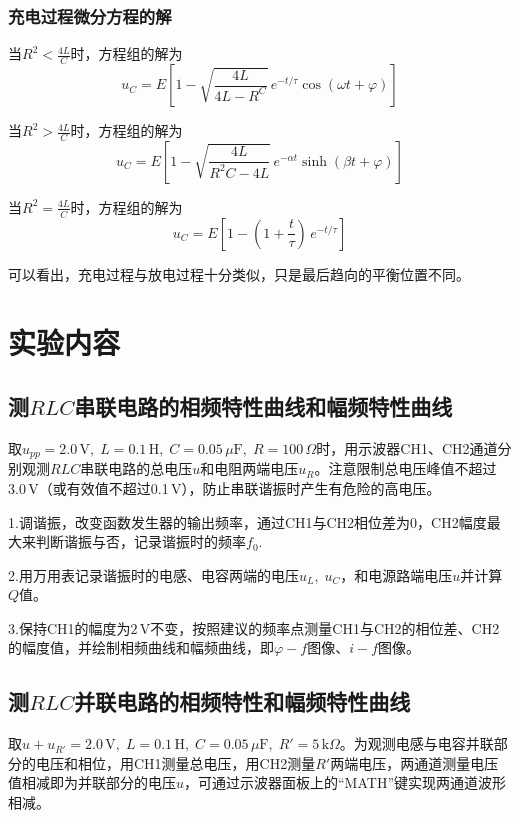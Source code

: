 \documentclass[UTF8]{article}
\theoremstyle{MyLineTheoremStyle} %
\theoremstyle{MyBlockTheoremStyle} %
\theoremstyle{MySubsubsectionStyle} %
\begin{document}
\subsubsection{充电过程微分方程的解}

当$ R^2<\frac{4L}{C} $时，方程组的解为
\begin{equation}
u_C=E\left[1-\sqrt{\frac{4L}{4L-R^C}}\,e^{-t/\tau}\cos(\omega t+\varphi)\right]
\end{equation}

当$ R^2>\frac{4L}{C} $时，方程组的解为
\begin{equation}
u_C=E\left[1-\sqrt{\frac{4L}{R^2C-4L}}\,e^{-\alpha t}\sinh(\beta t+\varphi)\right]
\end{equation}

当$ R^2=\frac{4L}{C} $时，方程组的解为
\begin{equation}
u_C=E\left[1-\left(1+\frac t\tau\right)\,e^{-t/\tau}\right]
\end{equation}

可以看出，充电过程与放电过程十分类似，只是最后趋向的平衡位置不同。

\section{实验内容}
\subsection{测$ RLC $串联电路的相频特性曲线和幅频特性曲线}
取$ u_{pp}=2.0\,\mathrm V,\;L=0.1\,\mathrm H,\;C=0.05\,\mu\mathrm F,\;R=100\,\Omega $时，用示波器CH1、CH2通道分别观测$ RLC $串联电路的总电压$ u $和电阻两端电压$ u_R $。注意限制总电压峰值不超过$ 3.0\,\mathrm V $（或有效值不超过0.1\,V），防止串联谐振时产生有危险的高电压。

1.调谐振，改变函数发生器的输出频率，通过CH1与CH2相位差为0，CH2幅度最大来判断谐振与否，记录谐振时的频率$ f_0 $.

2.用万用表记录谐振时的电感、电容两端的电压$ u_L,\;u_C $，和电源路端电压$ u $并计算$ Q $值。

3.保持CH1的幅度为$ 2\,\mathrm V $不变，按照建议的频率点测量CH1与CH2的相位差、CH2的幅度值，并绘制相频曲线和幅频曲线，即$ \varphi-f $图像、$ i-f $图像。

\subsection{测$ RLC $并联电路的相频特性和幅频特性曲线}
取$ u+u_{R'}=2.0\,\mathrm V,\;L=0.1\,\mathrm H,\;C=0.05\,\mu\mathrm F,\;R'=5\,\mathrm k\Omega $。为观测电感与电容并联部分的电压和相位，用CH1测量总电压，用CH2测量$ R' $两端电压，两通道测量电压值相减即为并联部分的电压$ u $，可通过示波器面板上的“MATH”键实现两通道波形相减。
\end{document}
